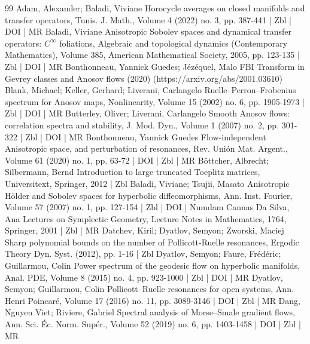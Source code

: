 \documentclass[10pt]{amsart}
\theoremstyle{definition}\newtheorem{defi}[theo]{Definition}\newtheorem{rema}[theo]{Remark}\newtheorem{exam}[theo]{Example}\newtheorem{exem}[theo]{Example}\newtheorem{nota}[theo]{Notation}
\begin{document}
\begin{thebibliography}{99}
Adam, Alexander; Baladi, Viviane Horocycle averages on closed manifolds and transfer operators, Tunis. J. Math., Volume 4 (2022) no. 3, pp. 387-441 | Zbl | DOI | MR
Baladi, Viviane Anisotropic Sobolev spaces and dynamical transfer operators: ${C}^\infty $ foliations, Algebraic and topological dynamics (Contemporary Mathematics), Volume 385, American Mathematical Society, 2005, pp. 123-135 | Zbl | DOI | MR
Bonthonneau, Yannick Guedes; Jézéquel, Malo FBI Transform in Gevrey classes and Anosov flows (2020) (https://arxiv.org/abs/2001.03610)
Blank, Michael; Keller, Gerhard; Liverani, Carlangelo Ruelle–Perron–Frobenius spectrum for Anosov maps, Nonlinearity, Volume 15 (2002) no. 6, pp. 1905-1973 | Zbl | DOI | MR
Butterley, Oliver; Liverani, Carlangelo Smooth Anosov flows: correlation spectra and stability, J. Mod. Dyn., Volume 1 (2007) no. 2, pp. 301-322 | Zbl | DOI | MR
Bonthonneau, Yannick Guedes Flow-independent Anisotropic space, and perturbation of resonances, Rev. Unión Mat. Argent., Volume 61 (2020) no. 1, pp. 63-72 | DOI | Zbl | MR
Böttcher, Albrecht; Silbermann, Bernd Introduction to large truncated Toeplitz matrices, Universitext, Springer, 2012 | Zbl
Baladi, Viviane; Tsujii, Masato Anisotropic Hölder and Sobolev spaces for hyperbolic diffeomorphisms, Ann. Inst. Fourier, Volume 57 (2007) no. 1, pp. 127-154 | Zbl | DOI | Numdam
Cannas Da Silva, Ana Lectures on Symplectic Geometry, Lecture Notes in Mathematics, 1764, Springer, 2001 | Zbl | MR
Datchev, Kiril; Dyatlov, Semyon; Zworski, Maciej Sharp polynomial bounds on the number of Pollicott-Ruelle resonances, Ergodic Theory Dyn. Syst. (2012), pp. 1-16 | Zbl
Dyatlov, Semyon; Faure, Frédéric; Guillarmou, Colin Power spectrum of the geodesic flow on hyperbolic manifolds, Anal. PDE, Volume 8 (2015) no. 4, pp. 923-1000 | Zbl | DOI | MR
Dyatlov, Semyon; Guillarmou, Colin Pollicott–Ruelle resonances for open systems, Ann. Henri Poincaré, Volume 17 (2016) no. 11, pp. 3089-3146 | DOI | Zbl | MR
Dang, Nguyen Viet; Riviere, Gabriel Spectral analysis of Morse–Smale gradient flows, Ann. Sci. Éc. Norm. Supér., Volume 52 (2019) no. 6, pp. 1403-1458 | DOI | Zbl | MR

\end{thebibliography}
\end{document}
